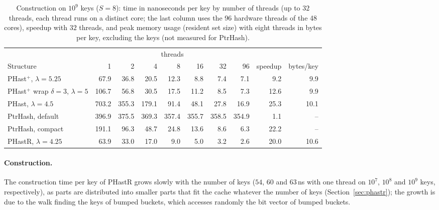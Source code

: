 \documentclass[11pt]{article}
\newcommand{\PHast}{PHast\xspace}
\newcommand{\PHastP}{PHast$^+$\xspace}
\newcommand{\PHastR}{PHastR\xspace}
\begin{document}
\begin{table}[t]
\centering
\caption{Construction on $10^9$ keys ($S=8$): time in nanoseconds per key by
number of threads (up to $32$ threads, each thread runs on a distinct core;
the last column uses the 96 hardware threads of the 48 cores), speedup with
$32$ threads, and peak memory usage (resident set size) with eight threads in
bytes per key, excluding the keys (not measured for PtrHash).}
\label{tab:threads}
\small
\setlength{\tabcolsep}{4.5pt}
\begin{tabular}{lrrrrrrrrr}
\toprule
& \multicolumn{7}{c}{threads} & & \\
\cmidrule(lr){2-8}
Structure & 1 & 2 & 4 & 8 & 16 & 32 & 96 & speedup & bytes/key \\
\midrule
\PHastP, $\lambda=5.25$ & 67.9 & 36.8 & 20.5 & 12.3 & 8.8 & 7.4 & 7.1 & 9.2 & 9.9 \\
\PHastP wrap $\delta=3$, $\lambda=5$ & 106.7 & 56.8 & 30.5 & 17.5 & 11.2 & 8.5 & 7.3 & 12.6 & 9.9 \\
\PHast, $\lambda=4.5$ & 703.2 & 355.3 & 179.1 & 91.4 & 48.1 & 27.8 & 16.9 & 25.3 & 10.1 \\
PtrHash, default & 396.9 & 375.5 & 369.3 & 357.4 & 355.7 & 358.5 & 354.9 & 1.1 & -- \\
PtrHash, compact & 191.1 & 96.3 & 48.7 & 24.8 & 13.6 & 8.6 & 6.3 & 22.2 & -- \\
\addlinespace
\PHastR, $\lambda=4.25$ & 63.9 & 33.0 & 17.0 & 9.0 & 5.0 & 3.2 & 2.6 & 20.0 & 10.6 \\
\bottomrule
\end{tabular}
\end{table}

\paragraph{Construction.}
The construction time per key of \PHastR grows slowly with the number of
keys ($54$, $60$ and $63$\,ns with one thread on $10^7$, $10^8$ and $10^9$
keys, respectively), as parts are distributed into smaller parts that fit
the cache whatever the number of keys (Section~\ref{sec:phastr}); the growth
is due to the walk finding the keys of bumped buckets, which accesses
randomly the bit vector of bumped buckets.
\end{document}
